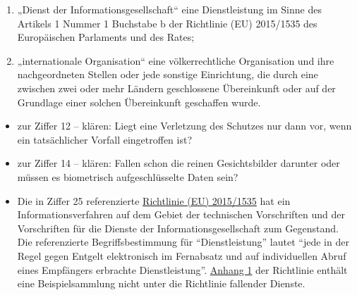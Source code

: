 \begin{enumerate}
  \item „Dienst der Informationsgesellschaft“ eine Dienstleistung im Sinne des Artikels 1 Nummer 1 Buchstabe b der
   Richtlinie (EU) 2015/1535 des Europäischen Parlaments und des Rates;
  \label{itm:04-28}

  \item „internationale Organisation“ eine völkerrechtliche Organisation und ihre nachgeordneten Stellen oder jede
   sonstige Einrichtung, die durch eine zwischen zwei oder mehr Ländern geschlossene Übereinkunft oder auf der
   Grundlage einer solchen Übereinkunft geschaffen wurde.
  \label{itm:04-29}

\end{enumerate}


\begin{itemize}

  \item zur Ziffer 12 -- klären: Liegt eine Verletzung des Schutzes nur dann vor, wenn ein tatsächlicher Vorfall
  eingetroffen ist?

  \item zur Ziffer 14 -- klären: Fallen schon die reinen Gesichtsbilder darunter oder müssen es biometrisch
  aufgeschlüsselte Daten sein?

  \item Die in Ziffer 25 referenzierte 
   \href{https://eur-lex.europa.eu/legal-content/DE/TXT/HTML/?uri=CELEX:32015L1535&qid=1659177673712&from=DE}{Richtlinie
    (EU) 2015/1535} hat  ein Informationsverfahren auf dem Gebiet der technischen Vorschriften und der Vorschriften für
    die Dienste der Informationsgesellschaft zum Gegenstand. Die referenzierte Begriffsbestimmung
    für "`Dienstleistung"' lautet "`jede in der Regel gegen Entgelt elektronisch im Fernabsatz und auf individuellen
    Abruf eines Empfängers erbrachte Dienstleistung"'. 
   \href{https://eur-lex.europa.eu/legal-content/DE/TXT/HTML/?uri=CELEX:32015L1535&qid=1659177673712&from=DE#d1e32-10-1}
    {Anhang 1} der Richtlinie enthält eine Beispielsammlung nicht unter die Richtlinie fallender Dienste.

\end{itemize}

